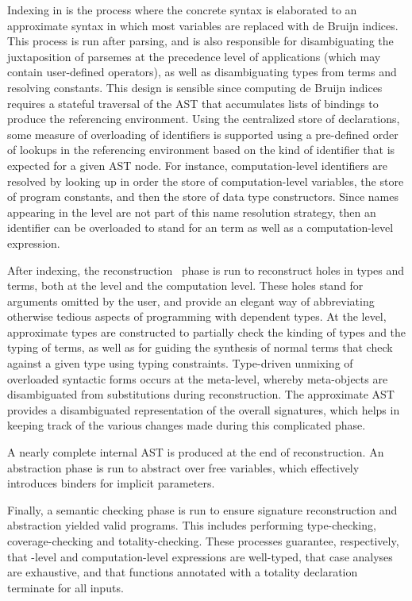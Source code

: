 Indexing in \Beluga is the process where the concrete syntax is elaborated to an approximate syntax in which most variables are replaced with de Bruijn indices.
This process is run after parsing, and is also responsible for disambiguating the juxtaposition of \LF parsemes at the precedence level of applications (which may contain user-defined operators), as well as disambiguating \LF types from terms and resolving constants.
This design is sensible since computing de Bruijn indices requires a stateful traversal of the \ac{AST} that accumulates lists of bindings to produce the referencing environment.
Using the centralized store of declarations, some measure of overloading of identifiers is supported using a pre-defined order of lookups in the referencing environment based on the kind of identifier that is expected for a given \ac{AST} node.
For instance, computation-level identifiers are resolved by looking up in order the store of computation-level variables, the store of program constants, and then the store of data type constructors.
Since names appearing in the \LF level are not part of this name resolution strategy, then an identifier can be overloaded to stand for an \LF term as well as a computation-level expression.

After indexing, the reconstruction~\cite{pientka2013insider} phase is run to reconstruct holes in types and terms, both at the \LF level and the computation level.
These holes stand for arguments omitted by the user, and provide an elegant way of abbreviating otherwise tedious aspects of programming with dependent types.
At the \LF level, approximate types are constructed to partially check the kinding of \LF types and the typing of \LF terms, as well as for guiding the synthesis of normal terms that check against a given type using typing constraints.
Type-driven unmixing of overloaded syntactic forms occurs at the meta-level, whereby meta-objects are disambiguated from substitutions during reconstruction.
The approximate \ac{AST} provides a disambiguated representation of the overall \Beluga signatures, which helps in keeping track of the various changes made during this complicated phase.

A nearly complete internal \ac{AST} is produced at the end of reconstruction.
An abstraction phase is run to abstract over free variables, which effectively introduces binders for implicit parameters.

Finally, a semantic checking phase is run to ensure signature reconstruction and abstraction yielded valid programs.
This includes performing type-checking, coverage-checking and totality-checking.
These processes guarantee, respectively, that \LF-level and computation-level expressions are well-typed, that case analyses are exhaustive, and that functions annotated with a totality declaration terminate for all inputs.

